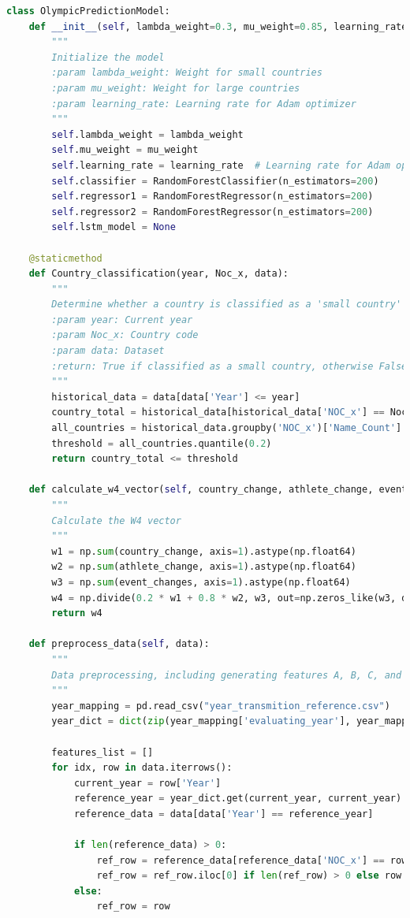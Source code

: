 \documentclass[12pt]{article}
\begin{document}
\begin{lstlisting}[language=Python, style=mystyle, caption=model.ipynb]
class OlympicPredictionModel:
    def __init__(self, lambda_weight=0.3, mu_weight=0.85, learning_rate=0.001):
        """
        Initialize the model
        :param lambda_weight: Weight for small countries
        :param mu_weight: Weight for large countries
        :param learning_rate: Learning rate for Adam optimizer
        """
        self.lambda_weight = lambda_weight
        self.mu_weight = mu_weight
        self.learning_rate = learning_rate  # Learning rate for Adam optimizer
        self.classifier = RandomForestClassifier(n_estimators=200)
        self.regressor1 = RandomForestRegressor(n_estimators=200)
        self.regressor2 = RandomForestRegressor(n_estimators=200)
        self.lstm_model = None

    @staticmethod
    def Country_classification(year, Noc_x, data):
        """
        Determine whether a country is classified as a 'small country' based on historical data
        :param year: Current year
        :param Noc_x: Country code
        :param data: Dataset
        :return: True if classified as a small country, otherwise False
        """
        historical_data = data[data['Year'] <= year]
        country_total = historical_data[historical_data['NOC_x'] == Noc_x]['Name_Count'].sum()
        all_countries = historical_data.groupby('NOC_x')['Name_Count'].sum()
        threshold = all_countries.quantile(0.2)
        return country_total <= threshold

    def calculate_w4_vector(self, country_change, athlete_change, event_changes):
        """
        Calculate the W4 vector
        """
        w1 = np.sum(country_change, axis=1).astype(np.float64)
        w2 = np.sum(athlete_change, axis=1).astype(np.float64)
        w3 = np.sum(event_changes, axis=1).astype(np.float64)
        w4 = np.divide(0.2 * w1 + 0.8 * w2, w3, out=np.zeros_like(w3, dtype=np.float64), where=w3 != 0)
        return w4

    def preprocess_data(self, data):
        """
        Data preprocessing, including generating features A, B, C, and All
        """
        year_mapping = pd.read_csv("year_transmition_reference.csv")
        year_dict = dict(zip(year_mapping['evaluating_year'], year_mapping['use_data_from']))

        features_list = []
        for idx, row in data.iterrows():
            current_year = row['Year']
            reference_year = year_dict.get(current_year, current_year)
            reference_data = data[data['Year'] == reference_year]

            if len(reference_data) > 0:
                ref_row = reference_data[reference_data['NOC_x'] == row['NOC_x']]
                ref_row = ref_row.iloc[0] if len(ref_row) > 0 else row
            else:
                ref_row = row


\end{lstlisting}
\end{document}
